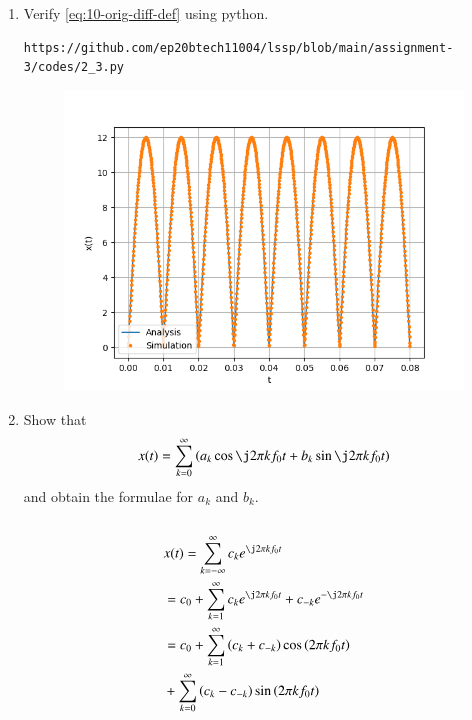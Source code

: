 \documentclass[journal,12pt,twocolumn]{IEEEtran}
\renewcommand\thesection{\arabic{section}}
\begin{document}
\begin{enumerate}[label=\thesection.\arabic*,ref=\thesection.\theenumi]
		\item Verify 
		\eqref{eq:10-orig-diff-def}
		using python.
		\begin{lstlisting}
https://github.com/ep20btech11004/lssp/blob/main/assignment-3/codes/2_3.py
		\end{lstlisting}
		\begin{figure}[!ht]
			\begin{center}
				\includegraphics[width=\columnwidth]{./figs/2_3.png}
			\end{center}
			\label{fig:}	
		\end{figure}	
		
		\item Show that 
		\begin{align}
			x(t) = \sum_{k = 0}^{\infty}\brak{a_k\cos{\j2\pi kf_0 t}+b_k\sin{\j2\pi kf_0 t}}
			\label{eq:one-Z-real}
		\end{align}
		and obtain the formulae for $a_k$ and $b_k$.\\
		\solution\\
		\begin{align}
			&x(t) = \sum_{k = -\infty}^{\infty}c_ke^{\j2\pi kf_0 t} \\
			&= c_0 + \sum_{k = 1}^{\infty}c_ke^{\j2\pi kf_0t} + c_{-k}e^{-\j2\pi kf_0t} \\
			&= c_0 + \sum_{k = 1}^{\infty}\brak{c_k + c_{-k}}\cos\brak{2\pi kf_0t}  \nonumber \\
			&+ \sum_{k = 0}^{\infty}\brak{c_k - c_{-k}}\sin\brak{2\pi kf_0t}
		\end{align}
		

\end{enumerate}
\end{document}

